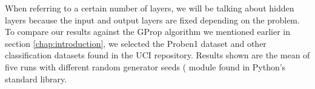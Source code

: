 \documentclass[runningheads]{llncs}
\begin{document}







When referring to a certain number of layers, we will be talking about hidden
layers because the input and output layers are fixed depending on the problem.
To compare our results against the GProp algorithm we mentioned earlier in
section \autoref{chap:introduction}, we selected the Proben1 \cite{Proben1}
dataset and other classification datasets found in the UCI \cite{uci}
repository. Results shown are the mean of five runs with different random
generator seeds ( 
module found in Python's
standard library.
\end{document}
